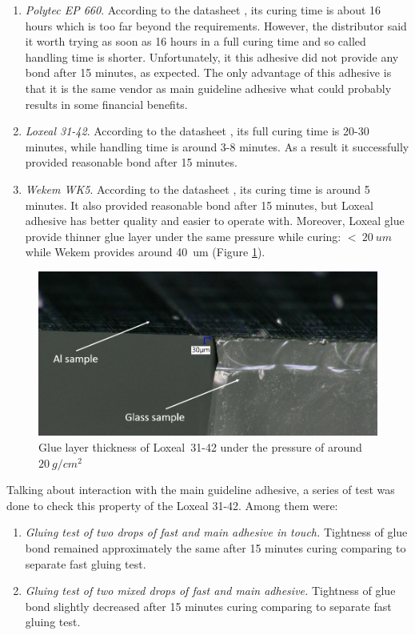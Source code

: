\begin{enumerate}
\setlength\itemsep{-0.5em}
\item \textit{Polytec EP 660}. According to the datasheet \cite{Polytec_EP_660_datasheet}, its curing time is about 16 hours which is too far beyond the requirements. However, the distributor said it worth trying as soon as 16 hours in a full curing time and so called handling time is shorter. Unfortunately, it this adhesive did not provide any bond after 15 minutes, as expected. The only advantage of this adhesive is that it is the same vendor as main guideline adhesive what could probably results in some financial benefits.
\item \textit{Loxeal 31-42}. According to the datasheet \cite{Loxeal_31_42_datasheet}, its full curing time is 20-30 minutes, while handling time is around 3-8 minutes. As a result it successfully provided reasonable bond after 15 minutes.
\item \textit{Wekem WK5}. According to the datasheet \cite{Wekem_WK_5_datasheet}, its curing time is around 5 minutes. It also provided reasonable bond after 15 minutes, but Loxeal adhesive has better quality and easier to operate with. Moreover, Loxeal glue provide thinner glue layer under the same pressure while curing: $<~20~um$ while Wekem provides around 40~um (Figure \ref{fig:glue_thickness}).
\end{enumerate}

\begin{figure}[ht]\centering
\includegraphics[width=0.7\linewidth]{Data/Module_assembly/Loxeal_393g_point_1.png}
\caption{Glue layer thickness of Loxeal~31-42 under the pressure of around $20~g/cm^{2}$}
\label{fig:glue_thickness}
\end{figure}

Talking about interaction with the main guideline adhesive, a series of test was done to check this property of the Loxeal 31-42. Among them were:

\begin{enumerate}
\setlength\itemsep{-0.5em}
\item \textit{Gluing test of two drops of fast and main adhesive in touch.} Tightness of glue bond remained approximately the same after 15 minutes curing comparing to separate fast gluing test.
\item \textit{Gluing test of two mixed drops of fast and main adhesive.} Tightness of glue bond slightly decreased after 15 minutes curing comparing to separate fast gluing test.
\end{enumerate}

